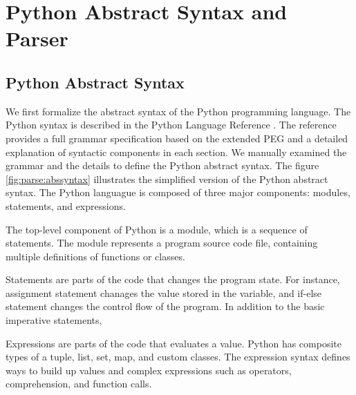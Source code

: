 \section{Python Abstract Syntax and Parser}\label{sec:pysyn}
\subsection{Python Abstract Syntax}

We first formalize the abstract syntax of the Python programming language.
The Python syntax is described in the 
Python Language Reference \cite{pythonref}.
The reference provides a full grammar specification based on the extended PEG
and a detailed explanation of syntactic components in each section.
We manually examined the grammar and the details
to define the Python abstract syntax.
The figure \ref{fig:parse:abssyntax} illustrates the simplified
version of the Python abstract syntax.
The Python languague is composed of three major components:
modules, statements, and expressions.

The top-level component of Python is a module, which is
a sequence of statements.
The module represents a program source code file,
containing multiple definitions of functions or classes.

Statements are parts of the code that changes the program state.
For instance, assignment statement chanages the
value stored in the variable, and if-else statement changes
the control flow of the program.
In addition to the basic imperative statements,

Expressions are parts of the code that evaluates a value.
Python has composite types of a tuple, list, set, map, and custom classes.
The expression syntax defines ways to build up values
and complex expressions such as operators, comprehension, and function calls. 

